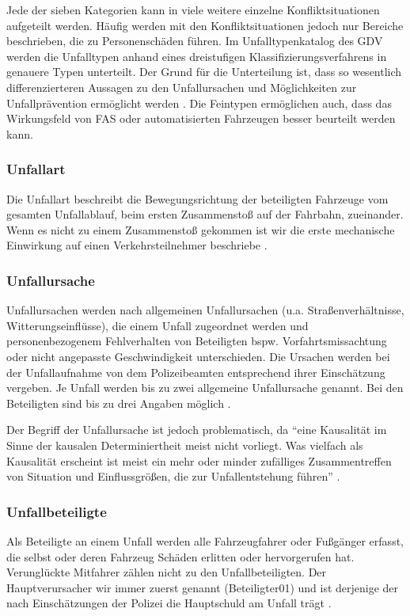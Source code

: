 Jede der sieben Kategorien kann in viele weitere einzelne Konfliktsituationen aufgeteilt werden. Häufig werden mit den Konfliktsituationen jedoch nur Bereiche beschrieben, die zu Personenschäden führen. Im Unfalltypenkatalog des \ac{GDV} werden die Unfalltypen anhand eines dreistufigen Klassifizierungsverfahrens in genauere Typen unterteilt. Der Grund für die Unterteilung ist, dass so wesentlich differenzierteren Aussagen zu den Unfallursachen und Möglichkeiten zur Unfallprävention ermöglicht werden \parencite[S. 106]{Grundl.2005}. Die Feintypen ermöglichen auch, dass das Wirkungsfeld von \ac{FAS} oder automatisierten Fahrzeugen besser beurteilt werden kann.

\subsubsection{Unfallart}
Die Unfallart beschreibt die Bewegungsrichtung der beteiligten Fahrzeuge vom gesamten Unfallablauf, beim ersten Zusammenstoß auf der Fahrbahn, zueinander. Wenn es nicht zu einem Zusammenstoß gekommen ist wir die erste mechanische Einwirkung auf einen Verkehrsteilnehmer beschriebe \parencite[S. 17]{StatistischesBundesamt.2018b}.

\subsubsection{Unfallursache}
Unfallursachen werden nach allgemeinen Unfallursachen (u.a. Straßenverhältnisse, Witterungseinflüsse), die einem Unfall zugeordnet werden und personenbezogenem Fehlverhalten von Beteiligten bspw. Vorfahrtsmissachtung oder nicht angepasste Geschwindigkeit unterschieden. Die Ursachen werden bei der Unfallaufnahme von dem Polizeibeamten entsprechend ihrer Einschätzung vergeben. Je Unfall werden bis zu zwei allgemeine Unfallursache genannt. Bei den Beteiligten sind bis zu drei Angaben möglich \parencite[S. 12]{StatistischesBundesamt.2018b}.

Der Begriff der Unfallursache ist jedoch problematisch, da \enquote{eine Kausalität im Sinne der kausalen Determiniertheit meist nicht vorliegt. Was vielfach als Kausalität erscheint ist meist ein mehr oder minder zufälliges Zusammentreffen von Situation und Einflussgrößen, die zur Unfallentstehung führen} \parencite[S. 3]{Reichart.2001}.

\subsubsection{Unfallbeteiligte}
Als Beteiligte an einem Unfall werden alle Fahrzeugfahrer oder Fußgänger erfasst, die selbst oder deren Fahrzeug Schäden erlitten oder hervorgerufen hat. Verunglückte Mitfahrer zählen nicht zu den Unfallbeteiligten. Der Hauptverursacher wir immer zuerst genannt (Beteiligter01) und ist derjenige der nach Einschätzungen der Polizei die Hauptschuld am Unfall trägt \parencite[S. 12]{StatistischesBundesamt.2018b}.

